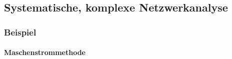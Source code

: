 \newpage 

\subsection{Systematische, komplexe Netzwerkanalyse}
\subsubsection{Beispiel}
\begin{minipage}{.1\textwidth}
\end{minipage}
\paragraph{Maschenstrommethode}
\begin{minipage}{.1\textwidth}
\end{minipage}
